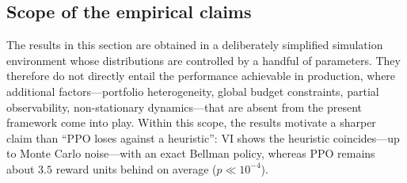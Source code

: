 \subsection{Scope of the empirical claims}
\label{subsec:scope}

The results in this section are obtained in a deliberately simplified simulation environment whose distributions are controlled by a handful of parameters. They therefore do not directly entail the performance achievable in production, where additional factors---portfolio heterogeneity, global budget constraints, partial observability, non-stationary dynamics---that are absent from the present framework come into play. Within this scope, the results motivate a sharper claim than ``PPO loses against a heuristic'': VI shows the heuristic coincides---up to Monte Carlo noise---with an exact Bellman policy, whereas PPO remains about $3.5$ reward units behind on average ($p \ll 10^{-4}$).